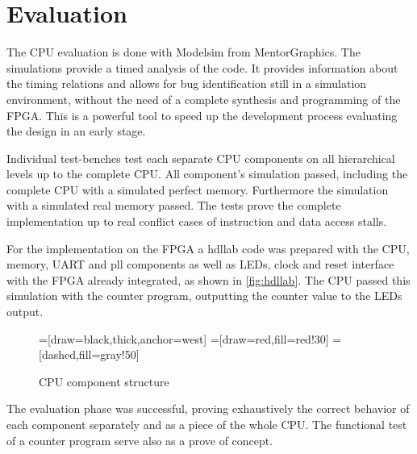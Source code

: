 \chapter{Evaluation}
The CPU evaluation is done with Modelsim from MentorGraphics. The simulations provide a timed analysis of the code. It provides information
about the timing relations and allows for bug identification still in a simulation environment, without the need of a complete synthesis
and programming of the FPGA. This is a powerful tool to speed up the development process evaluating the design in an early stage.

Individual test-benches test each separate CPU components on all hierarchical levels up to the complete CPU.
All component's simulation passed, including the complete CPU with a simulated perfect memory. Furthermore the
simulation with a simulated real memory passed. The tests prove the complete implementation up to real conflict cases of instruction and data access stalls.

For the implementation on the FPGA a hdllab code was prepared with the CPU, memory, UART and pll components as well as LEDs, clock and reset interface
with the FPGA already integrated, as shown in \autoref{fig:hdllab}. The CPU passed this simulation with the counter program, outputting the counter value to the LEDs output. 

\begin{figure}[h!]
\begin{center}
 =[draw=black,thick,anchor=west]
=[draw=red,fill=red!30]
=[dashed,fill=gray!50]
\caption{CPU component structure}
\label{fig:hdllab}
\end{center}
\end{figure}
The evaluation phase was successful, proving exhaustively the correct behavior of each component separately and as a piece of the whole CPU. The functional
test of a counter program serve also as a prove of concept. 